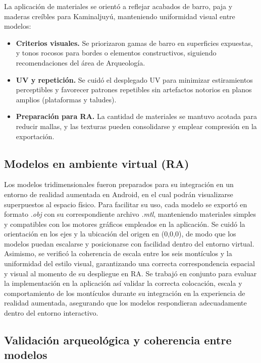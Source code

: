 La aplicación de materiales se orientó a reflejar acabados de barro, paja y maderas creíbles para Kaminaljuyú, manteniendo uniformidad visual entre modelos:
\begin{itemize}
    \item \textbf{Criterios visuales.} Se priorizaron gamas de barro en superficies expuestas, y tonos rocosos para bordes o elementos constructivos, siguiendo recomendaciones del área de Arqueología.
    \item \textbf{UV y repetición.} Se cuidó el desplegado UV para minimizar estiramientos perceptibles y favorecer patrones repetibles sin artefactos notorios en planos amplios (plataformas y taludes).
    \item \textbf{Preparación para RA.} La cantidad de materiales se mantuvo acotada para reducir mallas, y las texturas pueden consolidarse y emplear compresión en la exportación.
\end{itemize}

\subsection{Modelos en ambiente virtual (RA)}

Los modelos tridimensionales fueron preparados para su integración en un entorno de realidad aumentada en Android, en el cual podrán visualizarse superpuestos al espacio físico. Para facilitar su uso, cada modelo se exportó en formato \emph{.obj} con su correspondiente archivo \emph{.mtl}, manteniendo materiales simples y compatibles con los motores gráficos empleados en la aplicación. Se cuidó la orientación en los ejes y la ubicación del origen en (0,0,0), de modo que los modelos puedan escalarse y posicionarse con facilidad dentro del entorno virtual. Asimismo, se verificó la coherencia de escala entre los seis montículos y la uniformidad del estilo visual, garantizando una correcta correspondencia espacial y visual al momento de su despliegue en RA. Se trabajó en conjunto para evaluar la implementación en la aplicación así validar la correcta colocación, escala y comportamiento de los montículos durante su integración en la experiencia de realidad aumentada, asegurando que los modelos respondieran adecuadamente dentro del entorno interactivo.

\subsection{Validación arqueológica y coherencia entre modelos}

